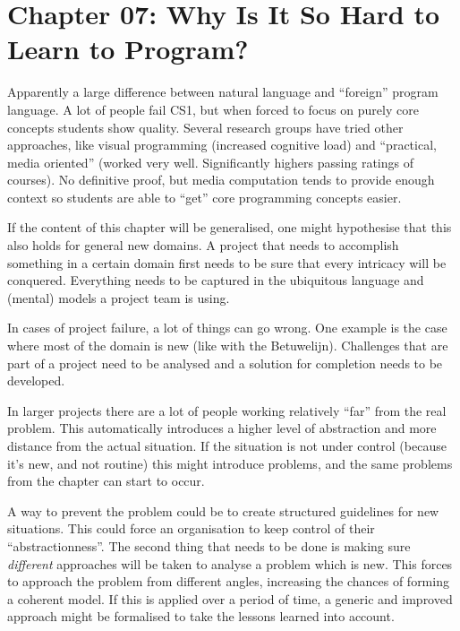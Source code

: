 \documentclass[]{uva-bachelor-thesis}
\title{\course}
\subtitle{\assignment}
\author{\group}
\begin{document}
\maketitle

\setlength{\parskip}{0px}
\tableofcontents
\setlength{\parskip}{.5em}

\clearpage

\chapter{Chapter 07: Why Is It So Hard to Learn to Program? \cite{makingsoftware}}
Apparently a large difference between natural language and ``foreign'' program language. 
A lot of people fail CS1, but when forced to focus on purely core concepts students show quality. 
Several research groups have tried other approaches, like visual programming (increased cognitive load) and ``practical, media oriented'' (worked very well. Significantly highers passing ratings of courses).
No definitive proof, but media computation tends to provide enough context so students are able to ``get'' core programming concepts easier. 

If the content of this chapter will be generalised, one might hypothesise that this also holds for general new domains. 
A project that needs to accomplish something in a certain domain first needs to be sure that every intricacy will be conquered.
Everything needs to be captured in the ubiquitous language and (mental) models a project team is using.

In cases of project failure, a lot of things can go wrong. 
One example is the case where most of the domain is new (like with the Betuwelijn). 
Challenges that are part of a project need to be analysed and a solution for completion needs to be developed. 

In larger projects there are a lot of people working relatively ``far'' from the real problem. 
This automatically introduces a higher level of abstraction and more distance from the actual situation. 
If the situation is not under control (because it's new, and not routine) this might introduce problems, and the same problems from the chapter can start to occur. 

A way to prevent the problem could be to create structured guidelines for new situations.
This could force an organisation to keep control of their ``abstractionness''. 
The second thing that needs to be done is making sure \emph{different} approaches will be taken to analyse a problem which is new. 
This forces to approach the problem from different angles, increasing the chances of forming a coherent model.
If this is applied over a period of time, a generic and improved approach might be formalised to take the lessons learned into account.
\end{document}
